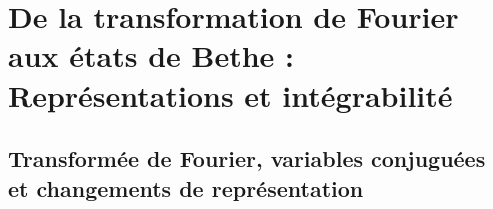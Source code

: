 \chapter{De la transformation de Fourier aux états de Bethe : Représentations et intégrabilité}\label{annex:Fourier}
\minitoc

\section{Transformée de Fourier, variables conjuguées et changements de représentation\label{sec:fourier_def_prop}}









